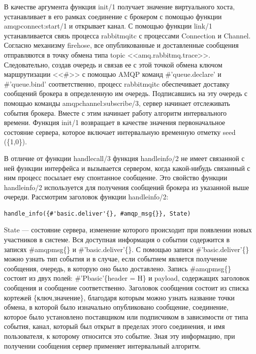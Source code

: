 В качестве аргумента функция init/1 получает значение виртуального хоста, устанавливает в его рамках соединение с брокером с помощью функции amqp\underline{\hspace{0.25cm}}connect:start/1 и открывает канал. С помощью функции link/1 устанавливается связь процесса rabbitmq\underline{\hspace{0.25cm}}itc с процессами Connection и Channel. Согласно механизму firehose, все опубликованные и доставленные сообщения отправляются в точку обмена типа topic <<amq.rabbitmq.trace>>. Следовательно, создав очередь и связав ее с этой точкой обмена ключом маршрутизации <<\#>> с помощью AMQP команд \#'queue.declare' и \#'queue.bind' соответственно, процесс rabbitmq\underline{\hspace{0.25cm}}itc обеспечивает доставку сообщений брокера в определенную им очередь. Подписавшись на эту очередь с помощью команды amqp\underline{\hspace{0.25cm}}channel:subscribe/3, сервер начинает отслеживать события брокера. Вместе с этим начинает работу алгоритм интервального времени. Функция init/1 возвращает в качестве значения первоначальное состояние сервера, которое включает интервальную временную отметку seed (\{1,0\}).

В отличие от функции handle\underline{\hspace{0.25cm}}call/3 функция handle\underline{\hspace{0.25cm}}info/2 не имеет связанной с ней функции интерфейса и вызывается сервером, когда какой-нибудь связанный с ним процесс посылает ему спонтанное сообщение. Это свойство функции handle\underline{\hspace{0.25cm}}info/2 используется для получения сообщений брокера из указанной выше очереди. Рассмотрим заголовок функции handle\underline{\hspace{0.25cm}}info/2:
\begin{lstlisting}
handle_info({#'basic.deliver'{}, #amqp_msg{}}, State)
\end{lstlisting}
State --- состояние сервера, изменение которого происходит при появлении новых участников в системе. Вся доступная информация о событии содержится в записях \#amqp\underline{\hspace{0.25cm}}msg\{\} и \#'basic.deliver'\{\}.  С помощью записи \#'basic.deliver'\{\} можно узнать тип события и в случае, если событием является получение сообщения, очередь, в которую оно было доставлено. Запись \#amqp\underline{\hspace{0.25cm}}msg\{\} состоит из двух полей: \#'P\underline{\hspace{0.25cm}}basic'\{header = H\} и payload, содержащих заголовок сообщения и сообщение соответственно. Заголовок сообщения состоит из списка кортежей \{ключ,значение\}, благодаря которым можно узнать название точки обмена, в которой было изначально опубликовано сообщение, соединение, которое было установлено поставщиком или подписчиком в зависимости от типа события, канал, который был открыт в пределах этого соединения, и имя пользователя, к которому относится это событие. Зная эту информацию, при получении сообщения сервер применяет интервальный алгоритм.

